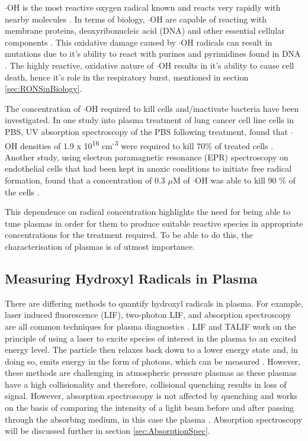 \documentclass[11pt, oneside]{article}   	%
\begin{document}
$\cdot$OH is the most reactive oxygen radical known and reacts very rapidly with nearby molecules \cite{Halliwell2007}. 
In terms of biology, $\cdot$OH are capable of reacting with membrane proteins, deoxyribonucleic acid (DNA) and other essential cellular components \cite{Block2001}.
This oxidative damage caused by $\cdot$OH radicals can result in mutations due to it's ability to react with purines and pyrimidines found in DNA \cite{Dizdaroglu2012}. 
The highly reactive, oxidative nature of $\cdot$OH results in it's ability to cause cell death, hence it's role in the respiratory burst, mentioned in section \ref{sec:RONSinBiology}.

The concentration of $\cdot$OH required to kill cells and/inactivate bacteria have been investigated.
In one study into plasma treatment of lung cancer cell line cells in PBS, UV absorption spectroscopy of the PBS following treatment, found that $\cdot$OH densities of 1.9 x 10\textsuperscript{16} cm\textsuperscript{-3} were required to kill 70\% of treated cells \cite{Attri2015}.
Another study, using electron paramagnetic resonance (EPR) spectroscopy on endothelial cells that had been kept in anoxic conditions to initiate free radical formation, found that a concentration of 0.3 $\mu$M of $\cdot$OH was able to kill 90 \% of the cells \cite{Zweier1988}.

This dependence on radical concentration highlights the need for being able to tune plasmas in order for them to produce suitable reactive species in appropriate concentrations for the treatment required.
To be able to do this, the characterisation of plasmas is of utmost importance.

\subsection{Measuring Hydroxyl Radicals in Plasma}

There are differing methods to quantify hydroxyl radicals in plasma.
For example, laser induced fluorescence (LIF), two-photon LIF, and absorption spectroscopy are all common techniques for plasma diagnostics \cite{Schroter2015}.
LIF and TALIF work on the principle of using a laser to excite species of interest in the plasma to an excited energy level. The particle then relaxes back down to a lower energy state and, in doing so, emits energy in the form of photons, which can be measured \cite{Ono1998}.
However, these methods are challenging in atmospheric pressure plasmas as these plasmas have a high collisionality and therefore, collisional quenching results in loss of signal.
However, absorption spectroscopy is not affected by quenching and works on the basis of comparing the intensity of a light beam before and after passing through the absorbing medium, in this case the plasma \cite{Reuter2015}.
Absorption spectroscopy will be discussed further in section \ref{sec:AbsorptionSpec}.
\end{document}
